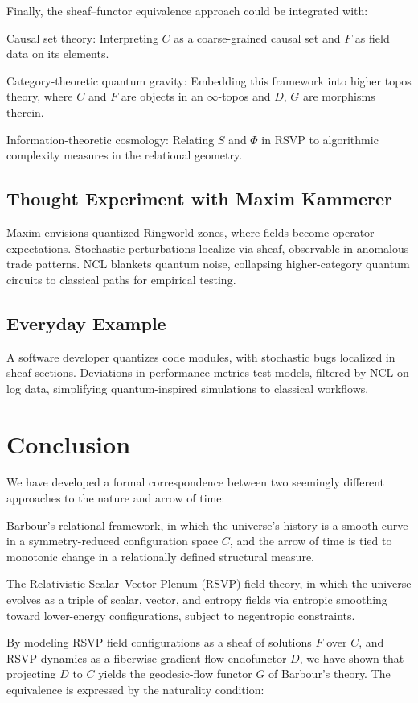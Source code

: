 \documentclass[11pt]{article}
\theoremstyle{plain}
\theoremstyle{definition}
\begin{document}
Finally, the sheaf–functor equivalence approach could be integrated with:

Causal set theory: Interpreting $C$ as a coarse-grained causal set and $F$ as field data on its elements.

Category-theoretic quantum gravity: Embedding this framework into higher topos theory, where $C$ and $F$ are objects in an $\infty$-topos and $D$, $G$ are morphisms therein.

Information-theoretic cosmology: Relating $S$ and $\Phi$ in RSVP to algorithmic complexity measures in the relational geometry.

\subsection{Thought Experiment with Maxim Kammerer}
Maxim envisions quantized Ringworld zones, where fields become operator expectations. Stochastic perturbations localize via sheaf, observable in anomalous trade patterns. NCL blankets quantum noise, collapsing higher-category quantum circuits to classical paths for empirical testing.

\subsection{Everyday Example}
A software developer quantizes code modules, with stochastic bugs localized in sheaf sections. Deviations in performance metrics test models, filtered by NCL on log data, simplifying quantum-inspired simulations to classical workflows.

\section{Conclusion}

We have developed a formal correspondence between two seemingly different approaches to the nature and arrow of time:

Barbour’s relational framework, in which the universe’s history is a smooth curve in a symmetry-reduced configuration space $C$, and the arrow of time is tied to monotonic change in a relationally defined structural measure.

The Relativistic Scalar–Vector Plenum (RSVP) field theory, in which the universe evolves as a triple of scalar, vector, and entropy fields via entropic smoothing toward lower-energy configurations, subject to negentropic constraints.

By modeling RSVP field configurations as a sheaf of solutions $F$ over $C$, and RSVP dynamics as a fiberwise gradient-flow endofunctor $D$, we have shown that projecting $D$ to $C$ yields the geodesic-flow functor $G$ of Barbour’s theory. The equivalence is expressed by the naturality condition:
\end{document}
